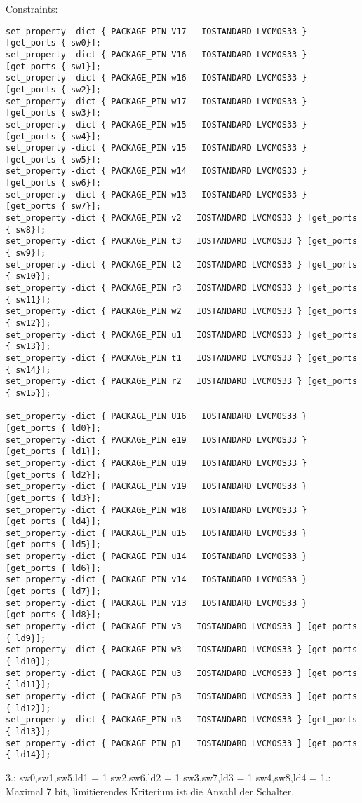 \documentclass{article}
\begin{document}
Constraints:\newline
\begin{verbatim}
set_property -dict { PACKAGE_PIN V17   IOSTANDARD LVCMOS33 } [get_ports { sw0}];
set_property -dict { PACKAGE_PIN V16   IOSTANDARD LVCMOS33 } [get_ports { sw1}];
set_property -dict { PACKAGE_PIN w16   IOSTANDARD LVCMOS33 } [get_ports { sw2}];
set_property -dict { PACKAGE_PIN w17   IOSTANDARD LVCMOS33 } [get_ports { sw3}];
set_property -dict { PACKAGE_PIN w15   IOSTANDARD LVCMOS33 } [get_ports { sw4}];
set_property -dict { PACKAGE_PIN v15   IOSTANDARD LVCMOS33 } [get_ports { sw5}];
set_property -dict { PACKAGE_PIN w14   IOSTANDARD LVCMOS33 } [get_ports { sw6}];
set_property -dict { PACKAGE_PIN w13   IOSTANDARD LVCMOS33 } [get_ports { sw7}];
set_property -dict { PACKAGE_PIN v2   IOSTANDARD LVCMOS33 } [get_ports { sw8}];
set_property -dict { PACKAGE_PIN t3   IOSTANDARD LVCMOS33 } [get_ports { sw9}];
set_property -dict { PACKAGE_PIN t2   IOSTANDARD LVCMOS33 } [get_ports { sw10}];
set_property -dict { PACKAGE_PIN r3   IOSTANDARD LVCMOS33 } [get_ports { sw11}];
set_property -dict { PACKAGE_PIN w2   IOSTANDARD LVCMOS33 } [get_ports { sw12}];
set_property -dict { PACKAGE_PIN u1   IOSTANDARD LVCMOS33 } [get_ports { sw13}];
set_property -dict { PACKAGE_PIN t1   IOSTANDARD LVCMOS33 } [get_ports { sw14}];
set_property -dict { PACKAGE_PIN r2   IOSTANDARD LVCMOS33 } [get_ports { sw15}];

set_property -dict { PACKAGE_PIN U16   IOSTANDARD LVCMOS33 } [get_ports { ld0}];
set_property -dict { PACKAGE_PIN e19   IOSTANDARD LVCMOS33 } [get_ports { ld1}];
set_property -dict { PACKAGE_PIN u19   IOSTANDARD LVCMOS33 } [get_ports { ld2}];
set_property -dict { PACKAGE_PIN v19   IOSTANDARD LVCMOS33 } [get_ports { ld3}];
set_property -dict { PACKAGE_PIN w18   IOSTANDARD LVCMOS33 } [get_ports { ld4}];
set_property -dict { PACKAGE_PIN u15   IOSTANDARD LVCMOS33 } [get_ports { ld5}];
set_property -dict { PACKAGE_PIN u14   IOSTANDARD LVCMOS33 } [get_ports { ld6}];
set_property -dict { PACKAGE_PIN v14   IOSTANDARD LVCMOS33 } [get_ports { ld7}];
set_property -dict { PACKAGE_PIN v13   IOSTANDARD LVCMOS33 } [get_ports { ld8}];
set_property -dict { PACKAGE_PIN v3   IOSTANDARD LVCMOS33 } [get_ports { ld9}];
set_property -dict { PACKAGE_PIN w3   IOSTANDARD LVCMOS33 } [get_ports { ld10}];
set_property -dict { PACKAGE_PIN u3   IOSTANDARD LVCMOS33 } [get_ports { ld11}];
set_property -dict { PACKAGE_PIN p3   IOSTANDARD LVCMOS33 } [get_ports { ld12}];
set_property -dict { PACKAGE_PIN n3   IOSTANDARD LVCMOS33 } [get_ports { ld13}];
set_property -dict { PACKAGE_PIN p1   IOSTANDARD LVCMOS33 } [get_ports { ld14}];
\end{verbatim}
3.: \newline
sw0,sw1,sw5,ld1 = 1\newline
sw2,sw6,ld2 = 1\newline
sw3,sw7,ld3 = 1\newline
sw4,sw8,ld4 = 1.: Maximal 7 bit, limitierendes Kriterium ist die Anzahl der Schalter.
\end{document}
